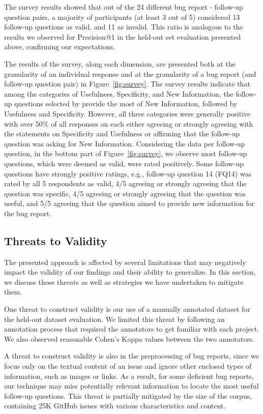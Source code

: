 The survey results showed that out of the 24 different bug report - follow-up question pairs, a majority of participants (at least 3 out of 5) considered 13 follow-up questions as valid, and 11 as invalid. This ratio is analogous to the results we observed for Precision@1 in the held-out set evaluation presented above, confirming our expectations.

The results of the survey, along each dimension, are presented both at the granularity of an individual response and at the granularity of a bug report (and follow-up question pair) in Figure~\ref{fig:survey}. The survey results indicate that among the categories of Usefulness, Specificity, and New Information, the follow-up questions selected by \evpi provide the most of New Information, followed by Usefulness and Specificity. However, all three categories were generally positive with over 50\% of all responses on each either agreeing or strongly agreeing with the statements on Specificity and Usefulness or affirming that the follow-up question was asking for New Information. Considering the data per follow-up question, in the bottom part of Figure~\ref{fig:survey}, we observe most follow-up questions, which were deemed as valid, were rated positively.  Some follow-up questions have strongly positive ratings, e.g., follow-up question 14 (FQ14) was rated by all 5 respondents as valid, 4/5 agreeing or strongly agreeing that the question was specific, 4/5 agreeing or strongly agreeing that the question was useful, and 5/5 agreeing that the question aimed to provide new information for the bug report.


\subsection{Threats to Validity}
The presented approach is affected by several limitations that may negatively impact the validity of our findings and their ability to generalize. In this section, we discuss those threats as well as strategies we have undertaken to mitigate them.

One threat to construct validity is our use of a manually annotated dataset for the held-out dataset evaluation. We limited this threat by following an annotation process that required the annotators to get familiar with each project. We also observed reasonable Cohen's Kappa values between the two annotators.

A threat to construct validity is also in the preprocessing of bug reports, since we focus only on the textual content of an issue and ignore other enclosed types of information, such as images or links. As a result, for some deficient bug reports, our technique may miss potentially relevant information to locate the most useful follow-up questions. This threat is partially mitigated by the size of the corpus, containing 25K GitHub issues with various characteristics and content.

